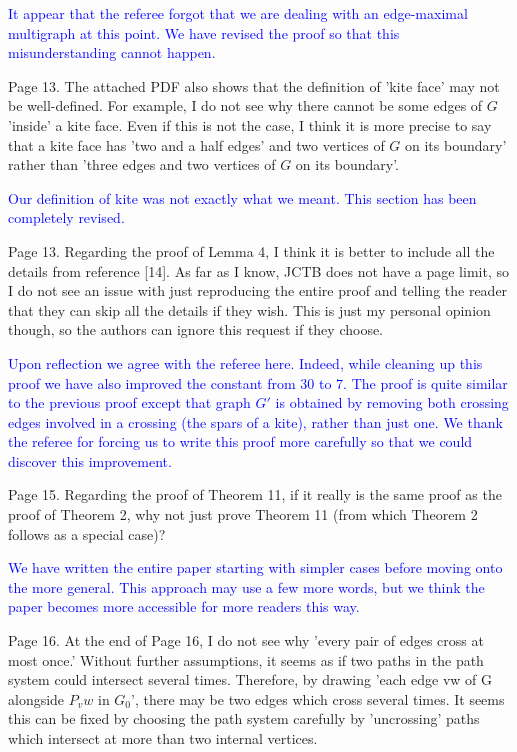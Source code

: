 \documentclass[12pt]{article}
\begin{document}
\textcolor{blue}{It appear that the referee forgot that we are dealing with an edge-maximal multigraph at this point. We have revised the proof so that this misunderstanding cannot happen.}


Page 13. The attached PDF also shows that the definition of 'kite
face' may not be well-defined.  For example, I do not see why there
cannot be some edges of $G$ 'inside' a kite face.  Even if this is not
the case, I think it is more precise to say that a kite face has 'two
and a half edges' and two vertices of $G$ on its boundary' rather than
'three edges and two vertices of $G$ on its boundary'.

\textcolor{blue}{Our definition of kite was not exactly what we meant. This section has been completely revised.}

Page 13.  Regarding the proof of Lemma 4, I think it is better to
include all the details from reference [14].  As far as I know, JCTB
does not have a page limit, so I do not see an issue with just
reproducing the entire proof and telling the reader that they can skip
all the details if they wish.  This is just my personal opinion
though, so the authors can ignore this request if they choose.

\textcolor{blue}{Upon reflection we agree with the referee here. Indeed, while cleaning up this proof we have also improved the constant from $30$ to $7$. The proof is quite similar to the previous proof except that graph $G'$ is obtained by removing both crossing edges involved in a crossing (the spars of a kite), rather than just one.  We thank the referee for forcing us to write this proof more carefully so that we could discover this improvement.}

Page 15. Regarding the proof of Theorem 11, if it really is the same
proof as the proof of Theorem 2, why not just prove Theorem 11 (from
which Theorem 2 follows as a special case)?

\textcolor{blue}{We have written the entire paper starting with simpler cases before moving onto the more general. This approach may use a few more words, but we think the paper becomes more accessible for more readers this way.}

Page 16.  At the end of Page 16, I do not see why 'every pair of edges
cross at most once.'  Without further assumptions, it seems as if two
paths in the path system could intersect several times.  Therefore, by
drawing 'each edge vw of G alongside $P_vw$ in $G_0$', there may be two
edges which cross several times.  It seems this can be fixed by
choosing the path system carefully by 'uncrossing' paths which
intersect at more than two internal vertices.
\end{document}
